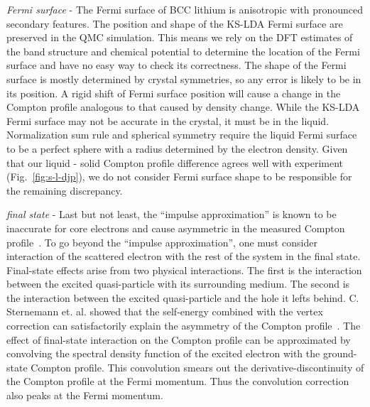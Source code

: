 \documentclass[aps,prb,showpacs,preprintnumbers,amsmath,amssymb,superscriptaddress,twocolumn]{revtex4-1}
\begin{document}
\emph{Fermi surface} - The Fermi surface of BCC lithium is anisotropic with pronounced secondary features. %
The position and shape of the KS-LDA Fermi surface are preserved in the QMC simulation. This means we rely on the DFT estimates of the band structure and chemical potential to determine the location of the Fermi surface and have no easy way to check its correctness.
The shape of the Fermi surface is mostly determined by crystal symmetries, so any error is likely to be in its position. A rigid shift of Fermi surface position will cause a change in the Compton profile analogous to that caused by density change.
While the KS-LDA Fermi surface may not be accurate in the crystal, it must be in the liquid. Normalization sum rule and spherical symmetry require the liquid Fermi surface to be a perfect sphere with a radius determined by the electron density.
Given that our liquid - solid Compton profile difference agrees well with experiment (Fig.~\ref{fig:s-l-djp}), we do not consider Fermi surface shape to be responsible for the remaining discrepancy.

\emph{final state} - Last but not least, the ``impulse approximation'' is known to be inaccurate for core electrons and cause asymmetric in the measured Compton profile~\cite{Eisenberger1970,Sternemann2000,Huotari2001}. To go beyond the ``impulse approximation'', one must consider interaction of the scattered electron with the rest of the system in the final state. Final-state effects arise from two physical interactions. The first is the interaction between the excited quasi-particle with its surrounding medium. The second is the interaction between the excited quasi-particle and the hole it lefts behind. C. Sternemann et. al. showed that the self-energy combined with the vertex correction can satisfactorily explain the asymmetry of the Compton profile~\cite{Sternemann2000}. The effect of final-state interaction on the Compton profile can be approximated by convolving the spectral density function of the excited electron with the ground-state Compton profile. This convolution smears out the derivative-discontinuity of the Compton profile at the Fermi momentum. Thus the convolution correction also peaks at the Fermi momentum.
\end{document}
